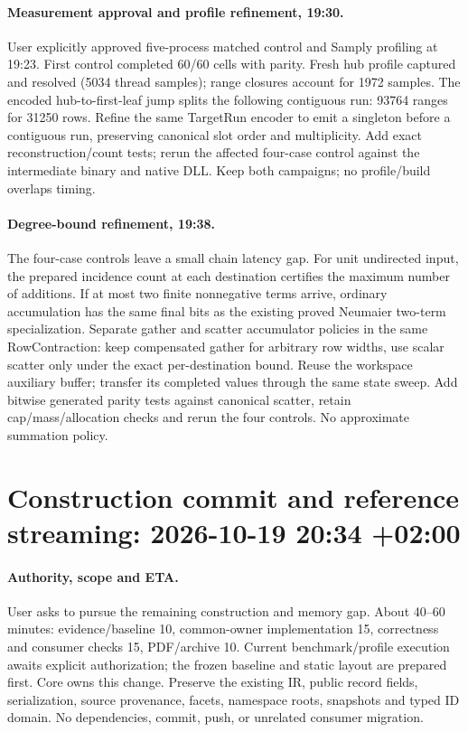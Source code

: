 \documentclass[11pt,a4paper]{article}
\begin{document}
\paragraph{Measurement approval and profile refinement, 19:30.} User explicitly approved
five-process matched control and Samply profiling at 19:23. First control completed 60/60
cells with parity. Fresh hub profile captured and resolved (5034 thread samples); range
closures account for 1972 samples. The encoded hub-to-first-leaf jump splits the following
contiguous run: 93764 ranges for 31250 rows. Refine the same TargetRun encoder to emit a
singleton before a contiguous run, preserving canonical slot order and multiplicity.
Add exact reconstruction/count tests; rerun the affected four-case control against the
intermediate binary and native DLL. Keep both campaigns; no profile/build overlaps timing.
\paragraph{Degree-bound refinement, 19:38.} The four-case controls leave a small chain
latency gap. For unit undirected input, the prepared incidence count at each destination
certifies the maximum number of additions. If at most two finite nonnegative terms arrive,
ordinary accumulation has the same final bits as the existing proved Neumaier two-term
specialization. Separate gather and scatter accumulator policies in the same RowContraction:
keep compensated gather for arbitrary row widths, use scalar scatter only under the exact
per-destination bound. Reuse the workspace auxiliary buffer; transfer its completed values
through the same state sweep. Add bitwise generated parity tests against canonical scatter,
retain cap/mass/allocation checks and rerun the four controls. No approximate summation policy.

\clearpage\section*{Construction commit and reference streaming: 2026-10-19 20:34 +02:00}
\paragraph{Authority, scope and ETA.} User asks to pursue the remaining construction and
memory gap. About 40--60 minutes: evidence/baseline 10, common-owner implementation 15,
correctness and consumer checks 15, PDF/archive 10. Current benchmark/profile execution
awaits explicit authorization; the frozen baseline and static layout are prepared first.
Core owns this change. Preserve the existing IR, public record fields, serialization,
source provenance, facets, namespace roots, snapshots and typed ID domain. No dependencies,
commit, push, or unrelated consumer migration.
\end{document}
